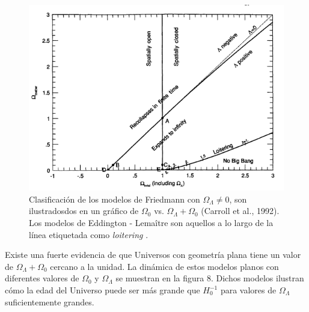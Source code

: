 \documentclass[11pt]{article}
\begin{document}
    
    \begin{figure}[H]         
     \centering
     \includegraphics[width=1.0\textwidth]{friedmann_worldspp228_Malcolm.png}
        \caption{\footnotesize{Clasificación de los modelos de Friedmann con $\Omega_{\Lambda} \neq 0$, son ilustradosdos en un gráfico de $\Omega_0$ vs. $\Omega_{\Lambda} + \Omega_0$ (Carroll et al., 1992). Los modelos de Eddington - Lema\^itre son aquellos a lo largo de la línea etiquetada como {\textit{loitering} }.}}
     \end{figure}
    
    Existe una fuerte evidencia de que Universos con geometría plana tiene un valor de $\Omega_{\Lambda} + \Omega_0$ cercano a la unidad. La dinámica de estos modelos planos con diferentes valores de $\Omega_0$ y $\Omega_{\Lambda}$ se muestran en la figura 8. Dichos modelos ilustran cómo la edad del Universo puede ser más grande que $H_0^{-1}$ para valores de $\Omega_{\Lambda}$ suficientemente grandes. 
    
\end{document}
